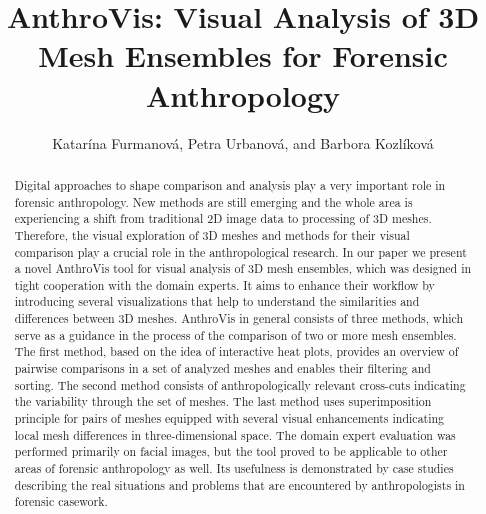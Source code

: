 \documentclass[final,5p,times]{elsarticle}
\begin{document}
\begin{frontmatter}


\title{AnthroVis: Visual Analysis of 3D Mesh Ensembles for Forensic Anthropology}

\author{Katar\'{i}na Furmanov\'{a}, Petra Urbanov\'{a}, and Barbora Kozl\'{i}kov\'{a}}
\address{}


\begin{abstract}
Digital approaches to shape comparison and analysis play a very important role in forensic anthropology. New methods are still emerging and the whole area is experiencing a shift from traditional 2D image data to processing of 3D meshes. Therefore, the visual exploration of 3D meshes and methods for their visual comparison play a crucial role in the anthropological research. In our paper we present a novel AnthroVis tool for visual analysis of 3D mesh ensembles, which was designed in tight cooperation with the domain experts. It aims to enhance their workflow by introducing several visualizations that help to understand the similarities and differences between 3D meshes. AnthroVis in general consists of three methods, which serve as a guidance in the process of the comparison of two or more mesh ensembles. The first method, based on the idea of interactive heat plots, provides an overview of pairwise comparisons in a set of analyzed meshes and enables their filtering and sorting. The second method consists of anthropologically relevant cross-cuts indicating the variability through the set of meshes. The last method uses superimposition principle for pairs of meshes equipped with several visual enhancements indicating local mesh differences in three-dimensional space. The domain expert evaluation was performed primarily on facial images, but the tool proved to be applicable to other areas of forensic anthropology as well. Its usefulness is demonstrated by case studies describing the real situations and problems that are encountered by anthropologists in forensic casework.
\end{abstract}



\end{frontmatter}
\end{document}
